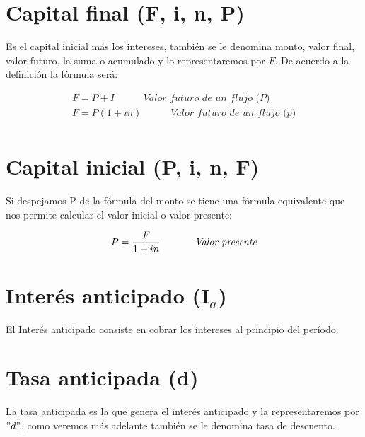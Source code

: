 \section{Capital final (F, i, n, P)}
Es el capital inicial más los intereses, también se le denomina monto, valor final, valor futuro, la suma o acumulado y lo representaremos por $F$. De acuerdo a la definición la fórmula será:

\begin{align*}
	F=P+I \hspace{35pt} \textit{Valor futuro de un flujo (P)}     \\
	F= P(1+in)\hspace{35pt} \textit{Valor futuro de un flujo (p)} \\
\end{align*}

\section{Capital inicial (P, i, n, F)}
Si despejamos P de la fórmula del monto se tiene una fórmula equivalente que nos permite calcular el valor inicial o valor presente:

\begin{align*}
	P=\frac{F}{1+in} \hspace{35 pt} \textit{Valor presente}
\end{align*}





\section{Interés anticipado (I$_{a}$)}
El Interés anticipado consiste en cobrar los intereses al principio del período.

\section{Tasa anticipada (d)}
La tasa anticipada es la que genera el interés anticipado y la representaremos por $"d"$, como veremos más adelante también se le denomina tasa de descuento.




